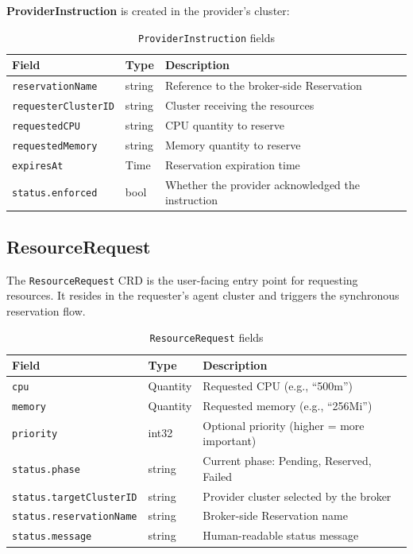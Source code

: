 \textbf{ProviderInstruction} is created in the provider's cluster:

\begin{table}[htbp]
\centering
\caption{\texttt{ProviderInstruction} fields}
\label{tab:provider-instruction}
\begin{tabular}{@{}llp{7cm}@{}}
\toprule
\textbf{Field} & \textbf{Type} & \textbf{Description} \\
\midrule
\texttt{reservationName} & string & Reference to the broker-side Reservation \\
\texttt{requesterClusterID} & string & Cluster receiving the resources \\
\texttt{requestedCPU} & string & CPU quantity to reserve \\
\texttt{requestedMemory} & string & Memory quantity to reserve \\
\texttt{expiresAt} & Time & Reservation expiration time \\
\texttt{status.enforced} & bool & Whether the provider acknowledged the instruction \\
\bottomrule
\end{tabular}
\end{table}


\subsection{ResourceRequest}
\label{subsec:resource-request}

The \texttt{ResourceRequest} CRD is the user-facing entry point for requesting resources. It resides in the requester's agent cluster and triggers the synchronous reservation flow.

\begin{table}[htbp]
\centering
\caption{\texttt{ResourceRequest} fields}
\label{tab:resource-request}
\begin{tabular}{@{}llp{7cm}@{}}
\toprule
\textbf{Field} & \textbf{Type} & \textbf{Description} \\
\midrule
\texttt{cpu} & Quantity & Requested CPU (e.g., ``500m'') \\
\texttt{memory} & Quantity & Requested memory (e.g., ``256Mi'') \\
\texttt{priority} & int32 & Optional priority (higher = more important) \\
\texttt{status.phase} & string & Current phase: Pending, Reserved, Failed \\
\texttt{status.targetClusterID} & string & Provider cluster selected by the broker \\
\texttt{status.reservationName} & string & Broker-side Reservation name \\
\texttt{status.message} & string & Human-readable status message \\
\bottomrule
\end{tabular}
\end{table}

